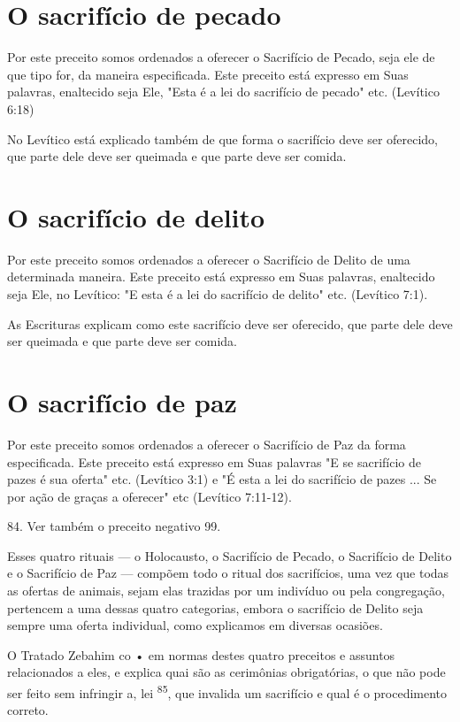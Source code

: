 \section{O sacrifício de pecado}

Por este preceito somos ordenados a oferecer o Sacrifício de Peca­do,
seja ele de que tipo for, da maneira especificada. Este preceito está
expres­so em Suas palavras, enaltecido seja Ele, "Esta é a lei do
sacrifício de pecado" etc. (Levítico 6:18)

No Levítico está explicado também de que forma o sacrifício deve ser
oferecido, que parte dele deve ser queimada e que parte deve ser comida.

\section{O sacrifício de delito}

Por este preceito somos ordenados a oferecer o Sacrifício de Delito de
uma determinada maneira. Este preceito está expresso em Suas palavras,
enal­tecido seja Ele, no Levítico: "E esta é a lei do sacrifício de
delito" etc. (Leví­tico 7:1).

As Escrituras explicam como este sacrifício deve ser oferecido, que
parte dele deve ser queimada e que parte deve ser comida.

\section{O sacrifício de paz}

Por este preceito somos ordenados a oferecer o Sacrifício de Paz da
forma especificada. Este preceito está expresso em Suas palavras "E se
sacrifí­cio de pazes é sua oferta" etc. (Levítico 3:1) e "É esta a lei
do sacrifício de pazes ... Se por ação de graças a oferecer" etc
(Levítico 7:11-12).

84. Ver também o preceito negativo 99.

Esses quatro rituais --- o Holocausto, o Sacrifício de Pecado, o
Sacri­fício de Delito e o Sacrifício de Paz --- compõem todo o ritual
dos sacrifícios, uma vez que todas as ofertas de animais, sejam elas
trazidas por um indivíduo ou pela congregação, pertencem a uma dessas
quatro categorias, embora o sa­crifício de Delito seja sempre uma oferta
individual, como explicamos em di­versas ocasiões.

O Tratado Zebahim co • em normas destes quatro preceitos e as­suntos
relacionados a eles, e explica quai são as cerimônias obrigatórias, o
que não pode ser feito sem infringir a, lei \textsuperscript{85}, que
invalida um sacrifício e qual é o procedimento correto.

